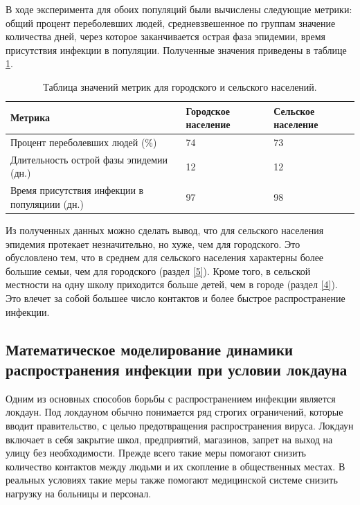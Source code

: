 \documentclass[14pt,a4paper]{article}
\begin{document}

\newpage
В ходе эксперимента для обоих популяций были вычислены следующие метрики: общий процент переболевших людей, средневзвешенное по группам значение количества дней, через которое заканчивается острая фаза эпидемии, время присутствия инфекции в популяции. Полученные значения приведены в таблице \ref{tab:res_compare}.

\begin{table}[h!]
	\centering
	\caption{Таблица значений метрик для городского и сельского населений.}
	\begin{tabularx}{\textwidth}{|X|X|X|}
		\hline
		Метрика & Городское население & Сельское население \\ 
		\hline
		Процент переболевших людей (\%)& 74 & 73 \\ 
		\hline
		Длительность острой фазы эпидемии (дн.) & 12 & 12\\ 
		\hline
		Время присутствия инфекции в популяциии (дн.)& 97 & 98\\ 
		\hline
	\end{tabularx}
	\label{tab:res_compare}
\end{table}

Из полученных данных можно сделать вывод, что для сельского населения эпидемия протекает незначительно, но хуже, чем для городского. Это обусловлено тем, что в среднем для сельского населения характерны более большие семьи, чем для городского (раздел \ref{5}). Кроме того, в сельской местности на одну школу  приходится больше детей, чем в городе (раздел \ref{4}). Это влечет за собой большее число контактов и более быстрое распространение инфекции.


\subsection{Математическое моделирование динамики распространения инфекции при условии локдауна} 

Одним из основных способов борьбы с распространением инфекции является локдаун.
Под локдауном обычно понимается ряд строгих ограничений, которые вводит правительство, с целью предотвращения распространения вируса. Локдаун включает в себя закрытие школ, предприятий, магазинов, запрет на выход на улицу без необходимости.
Прежде всего такие меры помогают снизить количество контактов между людьми и их скопление в общественных местах. В реальных условиях такие меры также помогают медицинской системе снизить нагрузку на больницы и персонал.
\end{document}
